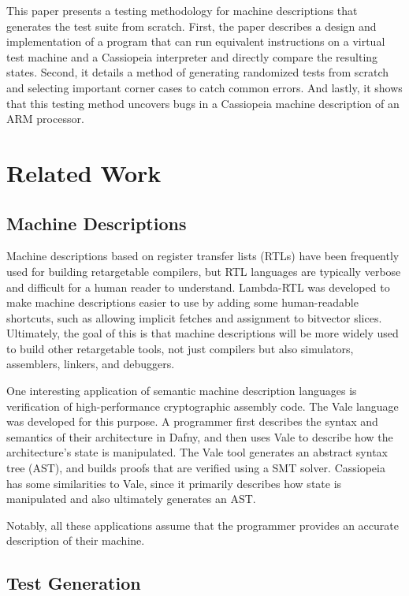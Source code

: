 \documentclass[letterpaper,12pt]{article}
\begin{document}
This paper presents a testing methodology for machine descriptions that generates the test suite from scratch. First, the paper describes a design and implementation of a program that can run equivalent instructions on a virtual test machine and a Cassiopeia interpreter and directly compare the resulting states. Second, it details a method of generating randomized tests from scratch and selecting important corner cases to catch common errors. And lastly, it shows that this testing method uncovers bugs in a Cassiopeia machine description of an ARM processor.

\section{Related Work}

\subsection{Machine Descriptions}

Machine descriptions based on register transfer lists (RTLs) have been frequently used for building retargetable compilers, but RTL languages are typically verbose and difficult for a human reader to understand. Lambda-RTL was developed to make machine descriptions easier to use by adding some human-readable shortcuts, such as allowing implicit fetches and assignment to bitvector slices. Ultimately, the goal of this is that machine descriptions will be more widely used to build other retargetable tools, not just compilers but also simulators, assemblers, linkers, and debuggers.

One interesting application of semantic machine description languages is verification of high-performance cryptographic assembly code. The Vale language was developed for this purpose. A programmer first describes the syntax and semantics of their architecture in Dafny, and then uses Vale to describe how the architecture's state is manipulated. The Vale tool generates an abstract syntax tree (AST), and builds proofs that are verified using a SMT solver. Cassiopeia has some similarities to Vale, since it primarily describes how state is manipulated and also ultimately generates an AST.

Notably, all these applications assume that the programmer provides an accurate description of their machine.

\subsection{Test Generation}
\end{document}
